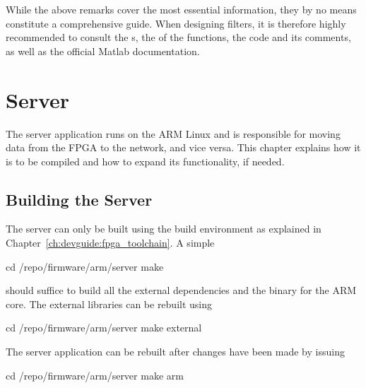 \vspace{2ex}
\vspace{2ex}

While the above remarks cover the most essential information, they by no means
constitute  a comprehensive  guide. When  designing filters,  it is  therefore
highly  recommended to  consult  the s,  the   of  the
functions,  the  code  and  its  comments, as  well  as  the  official  Matlab
documentation.

%
%
\chapter{Server} %
\label{ch:devguide:server}

The server application runs on the ARM  Linux and is responsible for moving
data from the FPGA to the network, and vice versa. This chapter explains how
it is to be compiled and how to expand its functionality, if needed.

\section{Building the Server} %
\label{sec:devguide:server:build}

The  server can  only be  built using  the build  environment as  explained in
Chapter~\ref{ch:devguide:fpga_toolchain}.  A simple
\begin{commandshell}
    cd /repo/firmware/arm/server
    make
\end{commandshell}
\noindent should suffice to build all the external dependencies and the binary
for the ARM core. The external libraries can be rebuilt using
\begin{commandshell}
    cd /repo/firmware/arm/server
    make external
\end{commandshell}
\noindent The server  application can be rebuilt after changes  have been made
by issuing
\begin{commandshell}
    cd /repo/firmware/arm/server
    make arm
\end{commandshell}

